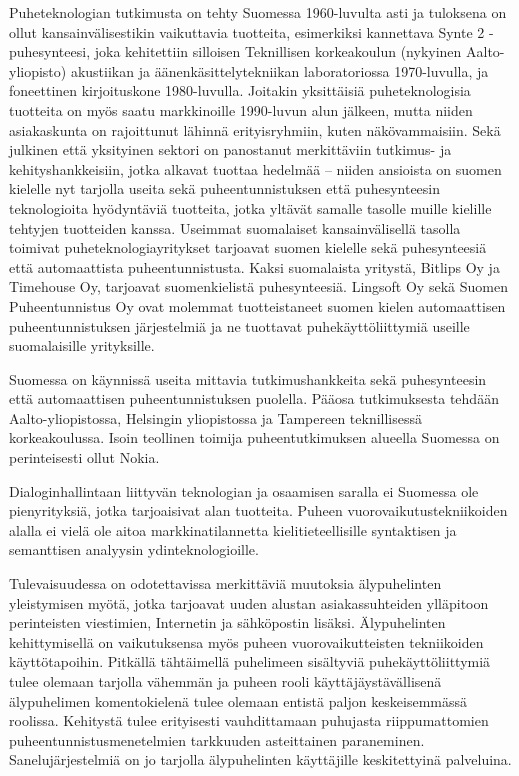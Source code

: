 \documentclass[]{../../metanetpaper}
\begin{document}
\begin{Parallel}[c]{70mm}{70mm}
{Puheteknologian tutkimusta on tehty Suomessa 1960-luvulta asti ja
tuloksena on ollut kansainvälisestikin vaikuttavia tuotteita,
esimerkiksi kannettava Synte 2 -puhesynteesi, joka kehitettiin
silloisen Teknillisen korkeakoulun (nykyinen Aalto-yliopisto)
akustiikan ja äänenkäsittelytekniikan laboratoriossa 1970-luvulla, ja
foneettinen kirjoituskone 1980-luvulla. Joitakin yksittäisiä
puheteknologisia tuotteita on myös saatu markkinoille 1990-luvun alun
jälkeen, mutta niiden asiakaskunta on rajoittunut lähinnä
erityisryhmiin, kuten näkövammaisiin. Sekä julkinen että yksityinen
sektori on panostanut merkittäviin tutkimus- ja kehityshankkeisiin,
jotka alkavat tuottaa hedelmää – niiden ansioista on suomen kielelle
nyt tarjolla useita sekä puheentunnistuksen että puhesynteesin
teknologioita hyödyntäviä tuotteita, jotka yltävät samalle tasolle
muille kielille tehtyjen tuotteiden kanssa. Useimmat suomalaiset
kansainvälisellä tasolla toimivat puheteknologiayritykset tarjoavat
suomen kielelle sekä puhesynteesiä että automaattista
puheentunnistusta. Kaksi suomalaista yritystä, Bitlips Oy ja Timehouse
Oy, tarjoavat suomenkielistä puhesynteesiä. Lingsoft Oy sekä Suomen
Puheentunnistus Oy ovat molemmat tuotteistaneet suomen kielen
automaattisen puheentunnistuksen järjestelmiä ja ne tuottavat
puhekäyttöliittymiä useille suomalaisille yrityksille.

Suomessa on käynnissä useita mittavia tutkimushankkeita sekä
puhesynteesin että automaattisen puheentunnistuksen puolella. Pääosa
tutkimuksesta tehdään Aalto-yliopistossa, Helsingin yliopistossa ja
Tampereen teknillisessä korkeakoulussa. Isoin teollinen toimija
puheentutkimuksen alueella Suomessa on perinteisesti ollut Nokia.

Dialoginhallintaan liittyvän teknologian ja osaamisen saralla ei
Suomessa ole pienyrityksiä, jotka tarjoaisivat alan tuotteita. Puheen
vuorovaikutustekniikoiden alalla ei vielä ole aitoa markkinatilannetta
kielitieteellisille syntaktisen ja semanttisen analyysin
ydinteknologioille.

Tulevaisuudessa on odotettavissa merkittäviä muutoksia älypuhelinten
yleistymisen myötä, jotka tarjoavat uuden alustan asiakassuhteiden
ylläpitoon perinteisten viestimien, Internetin ja sähköpostin
lisäksi. Älypuhelinten kehittymisellä on vaikutuksensa myös puheen
vuorovaikutteisten tekniikoiden käyttötapoihin. Pitkällä tähtäimellä
puhelimeen sisältyviä puhekäyttöliittymiä tulee olemaan tarjolla
vähemmän ja puheen rooli käyttäjäystävällisenä älypuhelimen
komentokielenä tulee olemaan entistä paljon keskeisemmässä
roolissa. Kehitystä tulee erityisesti vauhdittamaan puhujasta
riippumattomien puheentunnistusmenetelmien tarkkuuden asteittainen
paraneminen.  Sanelujärjestelmiä on jo tarjolla älypuhelinten
käyttäjille keskitettyinä palveluina.
}


\end{Parallel}
\end{document}
